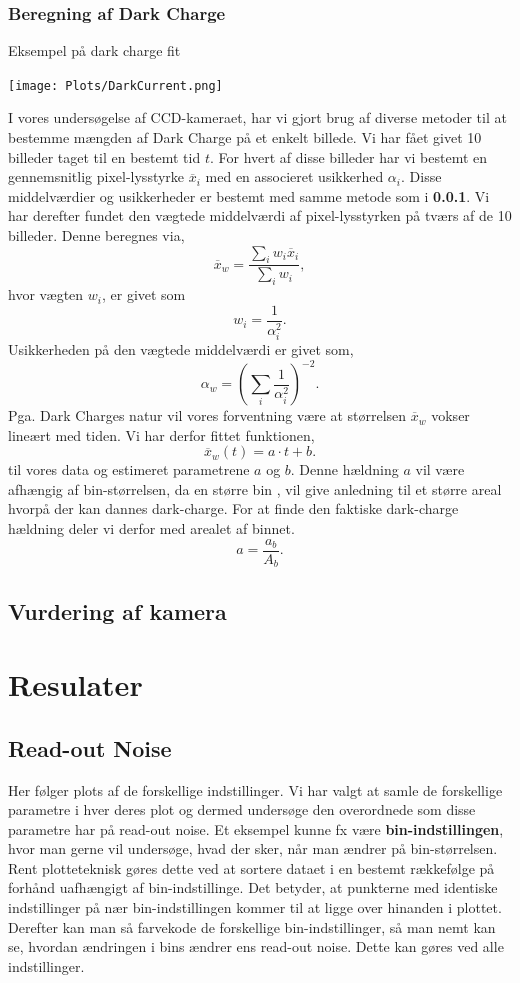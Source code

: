 \documentclass[working]{tuftebook}
\begin{document}
\subsection{Beregning af Dark Charge}
\begin{marginfigure}
	\centering
	\caption{Eksempel på dark charge fit}
	\texttt{[image: Plots/DarkCurrent.png]}
\end{marginfigure}
I vores undersøgelse af CCD-kameraet, har vi gjort brug af diverse metoder til at bestemme mængden af Dark Charge på et enkelt billede. Vi har fået givet 10 billeder taget til en bestemt tid $t$. For hvert af disse billeder har vi bestemt en gennemsnitlig pixel-lysstyrke $\overline{x}_i$ med en associeret usikkerhed $\alpha_i $. Disse middelværdier og usikkerheder er bestemt med samme metode som i \textbf{0.0.1}. Vi har derefter fundet den vægtede middelværdi af pixel-lysstyrken på tværs af de 10 billeder. Denne beregnes via,
\[
	\overline{x}_w = \frac{\sum_i w_i\overline{x}_i}{\sum_i w_i} 
,\]
hvor vægten $w_i$, er givet som
 \[
w_i = \frac{1}{\alpha _i^2}
.\]
Usikkerheden på den vægtede middelværdi er givet som,
\[
\alpha_w =\left( \sum_{i} \frac{1}{\alpha _i^2}   \right)^{-2}
.\]
Pga. Dark Charges natur vil vores forventning være at størrelsen $\overline{x}_w$ vokser lineært med tiden. Vi har derfor fittet funktionen,
\[
\overline{x}_w\left( t \right)  = a\cdot t + b
.\]
til vores data og estimeret parametrene $a$ og $b$. Denne hældning $a$ vil være afhængig af bin-størrelsen, da en større bin , vil give anledning til et større areal hvorpå der kan dannes dark-charge. For at finde den faktiske dark-charge hældning deler vi derfor med arealet af binnet.
\[
a = \frac{a_b}{A_b}
.\] 
\section{Vurdering af kamera}
\chapter{Resulater}
\section{Read-out Noise}
Her følger plots af de forskellige indstillinger. Vi har valgt at samle de forskellige parametre i hver deres plot og dermed undersøge den overordnede som disse parametre har på read-out noise.
Et eksempel kunne fx være \textbf{bin-indstillingen}, hvor man gerne vil undersøge, hvad der sker, når man ændrer på bin-størrelsen. Rent plotteteknisk gøres dette ved at sortere dataet i en bestemt rækkefølge på forhånd uafhængigt af bin-indstillinge. Det betyder, at punkterne med identiske indstillinger på nær bin-indstillingen kommer til at ligge over hinanden i plottet. Derefter kan man så farvekode de forskellige bin-indstillinger, så man nemt kan se, hvordan ændringen i bins ændrer ens read-out noise. Dette kan gøres ved alle indstillinger.
\end{document}
